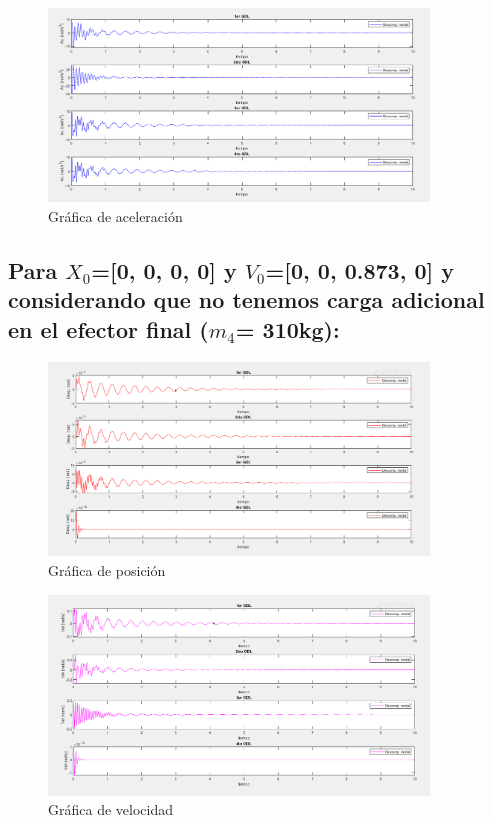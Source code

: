 \documentclass{aleph-revista}
\begin{document}
\begin{figure}[H]
    \centering
    \includegraphics[width=0.90\textwidth]{Imagenes/r6.png}
    \caption{Gráfica de aceleración}
    \label{fig:etiqueta de la figura}
\end{figure}


\subsection{Para $X_0$=[0, 0, 0, 0] y $V_0$=[0, 0, 0.873, 0] y considerando que no tenemos carga adicional en el efector final ($m_4$= 310kg):}
\begin{figure}[H]
    \centering
    \includegraphics[width=0.90\textwidth]{Imagenes/r7.png}
    \caption{Gráfica de posición}
    \label{fig:etiqueta de la figura}
\end{figure}

\begin{figure}[H]
    \centering
    \includegraphics[width=0.90\textwidth]{Imagenes/r8.png}
    \caption{Gráfica de velocidad}
    \label{fig:etiqueta de la figura}
\end{figure}
\end{document}

